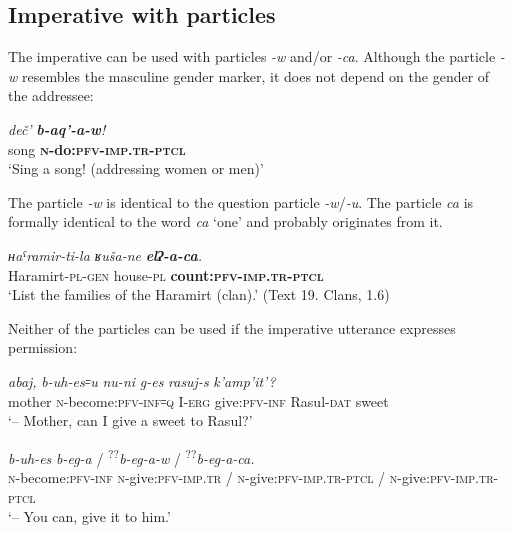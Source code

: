 ﻿\documentclass[output=paper]{langsci/langscibook}
\begin{document}
\subsection{Imperative with particles}


The imperative can be used with particles \emph{-w} and/or \emph{-ca}.
Although the particle \emph{-w} resembles the masculine gender marker, it
does not depend on the gender of the addressee:

\ea %
\gll  \emph{deč'}  \emph{\textbf{b-aq'-a-w}!}\\
 song  \textbf{\textsc{n}-do:\textsc{pfv}-\textsc{imp}.\textsc{tr}-\textsc{ptcl}}\\
\glt `Sing a song! (addressing women or men)'
\z

The particle \emph{-w} is identical to the question particle
\emph{-w}/\emph{-u}. The particle \emph{ca} is formally identical to the word
\emph{ca} `one' and probably originates from it.

\ea %
\gll  \emph{ʜaˤramir-ti-la}  \emph{ʁuša-ne}  \emph{\textbf{elʔ-a-ca}.}\\
 Haramirt-\textsc{pl}-\textsc{gen}  house-\textsc{pl} \textbf{count:\textsc{pfv}-\textsc{imp}.\textsc{tr}-\textsc{ptcl}}\\
\glt `List the families of the Haramirt (clan).' (Text 19. Clans, 1.6)
\z

Neither of the particles can be used if the imperative utterance
expresses permission:

\ea %
\gll \emph{abaj,} \emph{b-uh-es꞊u} \emph{nu-ni} \emph{g-es} \emph{rasuj-s} \emph{k'amp'it'\rlap?}\\
mother \textsc{n}-become:\textsc{pfv}-\textsc{inf}꞊\textsc{q} I-\textsc{erg} give:\textsc{pfv}-\textsc{inf} Rasul-\textsc{dat} sweet\\ 
\glt `– Mother, can I give a sweet to Rasul?'

\vspace{\jot}

\gll \emph{b-uh-es} \emph{b-eg-a} / \textsuperscript{??}\emph{b-eg-a-w}  / \textsuperscript{??}\emph{b-eg-a-ca.}\\
\textsc{n}-become:\textsc{pfv}-\textsc{inf} \textsc{n}-give:\textsc{pfv}-\textsc{imp}.\textsc{tr} / \textsc{n}-give:\textsc{pfv}-\textsc{imp}.\textsc{tr}-\textsc{ptcl} / \textsc{n}-give:\textsc{pfv}-\textsc{imp}.\textsc{tr}-\textsc{ptcl}\\
\glt `– You can, give it to him.'
\z
\end{document}
